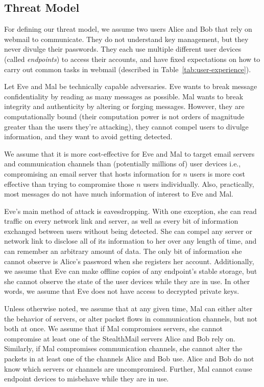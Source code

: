 \subsection{Threat Model}
For defining our threat model, we assume two users Alice and Bob that rely on webmail to communicate. They do not understand key management, but they never divulge their passwords. They each use multiple different user devices (called \emph{endpoints}) to access their accounts, and have fixed expectations on how to carry out common tasks in webmail (described in Table~\ref{tab:user-experience}).

Let Eve and Mal be technically capable adversaries.  Eve wants to break message confidentiality by reading as many messages as possible.  Mal wants to break integrity and authenticity by altering or forging messages.  However, they are computationally bound (their computation power is not orders of magnitude greater than the users they're attacking), they cannot compel users to divulge information, and they want to avoid getting detected. 

We assume that it is more cost-effective for Eve and Mal to target email servers and communication channels than (potentially millions of) user devices i.e., compromising an email server that hosts information for $n$ users is more cost effective than trying to compromise those $n$ users individually. Also, practically, most messages do not have much information of interest to Eve and Mal.

Eve's main method of attack is eavesdropping.  With one exception, she can read traffic on every network link and server, as well as every bit of information exchanged between users without being detected.  She can compel any server or network link to disclose all of its information to her over any length of time, and can remember an arbitrary amount of data. The only bit of information she cannot observe is Alice's password when she registers her account. Additionally, we assume that Eve can make offline copies of any endpoint's stable storage, but she cannot observe the state of the user devices while they are in use. In other words, we assume that Eve does not have access to decrypted private keys.  

Unless otherwise noted, we assume that at any given time, Mal can either alter the behavior of servers, or alter packet flows in communication channels, but not both at once. We assume that if Mal compromises servers, she cannot compromise at least one of the StealthMail servers Alice and Bob rely on. Similarly, if Mal compromises communication channels, she cannot alter the packets in at least one of the channels Alice and Bob use.  Alice and Bob do not know which servers or channels are uncompromised.  Further, Mal cannot cause endpoint devices to misbehave while they are in use.

